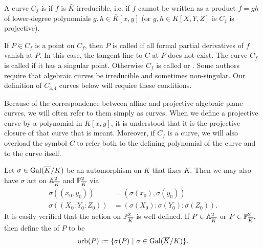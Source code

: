 A curve $C_f$ is  if $f$ is $\bar K$-irreducible,
i.e. if $f$ cannot be written as a product $f = gh$ of lower-degree polynomials $g, h \in \bar K[x,y]$
(or $g,h \in K[X,Y,Z]$ is $C_f$ is projective).

If $P \in C_f$ is a point on $C_f$,
then $P$ is called  if all formal partial derivatives of $f$ vanish at $P$.
In this case, the tangent line to $C$ at $P$ does not exist.
The curve $C_f$ is called  if it has a singular point.
Otherwise $C_f$ is called  or .
Some authors require that algebraic curves be irreducible and sometimes non-singular.
Our definition of $C_{3,4}$ curves below will require these conditions.

Because of the correspondence between affine and projective algebraic plane curves,
we will often refer to them simply as curves.
When we define a projective curve by a polynomial in $K[x,y]$,
it is understood that it is the projective closure of that curve that is meant.
Moreover, if $C_f$ is a curve,
we will also overload the symbol $C$ to refer both to the defining polynomial of the curve
and to the curve itself.

Let $\sigma \in \operatorname{Gal}(\overline K/K)$ be an automorphism on $\bar K$ that fixes $K$.
Then we may also have $\sigma$ act on $\mathbb{A}_{\overline K}^2$ and $\mathbb{P}_{\overline K}^2$ via
\begin{align}
  \label{eq_galois_action_on_point}
  \sigma((x_0, y_0)) &= (\sigma(x_0), \sigma(y_0)) \\
  \sigma((X_0 : Y_0 : Z_0)) &= (\sigma(X_0) : \sigma(Y_0) : \sigma(Z_0)). \nonumber
\end{align}
It is easily verified that the action on $\mathbb{P}_{\overline K}^2$ is well-defined.
If $P \in \mathbb{A}_{\overline K}^2$ or $P \in \mathbb{P}_{\overline K}^2$,
then define the  of $P$ to be
\[ \operatorname{orb}(P) := \{ \sigma(P) ~|~ \sigma \in \operatorname{Gal}(\overline K/K) \}. \]

